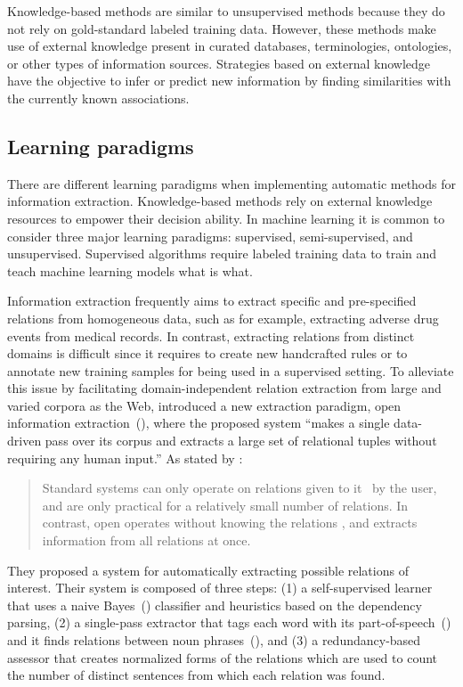 Knowledge-based methods are similar to unsupervised methods because they do not rely on gold-standard labeled training data.
However, these methods make use of external knowledge present in curated databases, terminologies, ontologies, or other types of information sources.
Strategies based on external knowledge have the objective to infer or predict new information by finding similarities with the currently known associations.


\subsection{Learning paradigms}

There are different learning paradigms when implementing automatic methods for information extraction.
Knowledge-based methods rely on external knowledge resources to empower their decision ability.
In machine learning it is common to consider three major learning paradigms: supervised, semi-supervised, and unsupervised.
Supervised algorithms require labeled training data to train and teach machine learning models what is what.

Information extraction frequently aims to extract specific and pre-specified relations from homogeneous data, such as for example, extracting adverse drug events from medical records.
In contrast, extracting relations from distinct domains is difficult since it requires to create new handcrafted rules or to annotate new training samples for being used in a supervised setting.
To alleviate this issue by facilitating domain-independent relation extraction from large and varied corpora as the Web, \textcite{banko2007a} introduced a new extraction paradigm, open information extraction~(), where the proposed system \enquote{makes a single data-driven pass over its corpus and extracts a large set of relational tuples without requiring any human input.}
As stated by \textcite{banko2007a}:

\blockquote{%
Standard  systems can only operate on relations given to it \apriori\ by the user, and are only practical for a relatively small number of relations.
In contrast, open  operates without knowing the relations \apriori, and extracts information from all relations at once.
}

They proposed a system for automatically extracting possible relations of interest.
Their system is composed of three steps: (1) a self-supervised learner that uses a naive Bayes~() classifier and heuristics based on the dependency parsing, (2) a single-pass extractor that tags each word with its part-of-speech~() and it finds relations between noun phrases~(), and (3) a redundancy-based assessor that creates normalized forms of the relations which are used to count the number of distinct sentences from which each relation was found.


